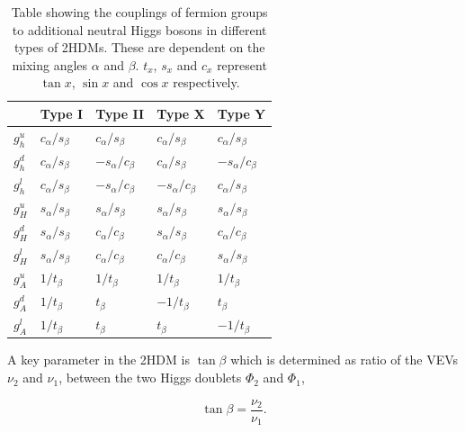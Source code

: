 \begin{table}[H]
    \centering
    \begin{tabular}{|x{1.0cm}|x{2.0cm}x{2.0cm}x{2.0cm}x{2.0cm}|}
    		\hline
    	 	& Type I & Type II & Type X & Type Y \\
    	 	\hline
    	 	\hline
    	 	$g_{h}^{u}$ & $c_{\alpha}/s_{\beta}$ & $c_{\alpha}/s_{\beta}$  & $c_{\alpha}/s_{\beta}$  & $c_{\alpha}/s_{\beta}$  \\ 
    	 	$g_{h}^{d}$ & $c_{\alpha}/s_{\beta}$ & $-s_{\alpha}/c_{\beta}$ & $c_{\alpha}/s_{\beta}$  & $-s_{\alpha}/c_{\beta}$ \\
    	 	$g_{h}^{l}$ & $c_{\alpha}/s_{\beta}$ & $-s_{\alpha}/c_{\beta}$ & $-s_{\alpha}/c_{\beta}$ & $c_{\alpha}/s_{\beta}$  \\
    	 	\hline
    	 	$g_{H}^{u}$ & $s_{\alpha}/s_{\beta}$ & $s_{\alpha}/s_{\beta}$ & $s_{\alpha}/s_{\beta}$ & $s_{\alpha}/s_{\beta}$ \\
    	 	$g_{H}^{d}$ & $s_{\alpha}/s_{\beta}$ & $c_{\alpha}/c_{\beta}$ & $s_{\alpha}/s_{\beta}$ & $c_{\alpha}/c_{\beta}$ \\
    	 	$g_{H}^{l}$ & $s_{\alpha}/s_{\beta}$ & $c_{\alpha}/c_{\beta}$ & $c_{\alpha}/c_{\beta}$ & $s_{\alpha}/s_{\beta}$ \\
    	 	\hline
    	 	$g_{A}^{u}$ & $1/t_{\beta}$ & $1/t_{\beta}$ & $1/t_{\beta}$  & $1/t_{\beta}$ \\
    	 	$g_{A}^{d}$ & $1/t_{\beta}$ & $t_{\beta}$   & $-1/t_{\beta}$ & $t_{\beta}$ \\
    	 	$g_{A}^{l}$ & $1/t_{\beta}$ & $t_{\beta}$   & $t_{\beta}$    & $-1/t_{\beta}$ \\
        \hline
    \end{tabular}
    \caption[The couplings of fermions groups to additional Higgs bosons in the 2HDMs.]{Table showing the couplings of fermion groups to additional neutral Higgs bosons in different types of 2HDMs. These are dependent on the mixing angles $\alpha$ and $\beta$. $t_{x}$, $s_{x}$ and $c_{x}$ represent $\tan x$, $\sin x$ and $\cos x$ respectively.}
    \label{tab:2hdm_couplings}
\end{table}

A key parameter in the \ac{2HDM} is $\tan\beta$ which is determined as ratio of the \ac{VEV}s $\nu_2$ and $\nu_1$, between the two Higgs doublets $\Phi_2$ and $\Phi_1$,

\begin{equation}
\tan\beta = \frac{\nu_2}{\nu_1}.
\end{equation}

